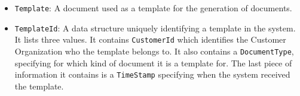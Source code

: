 \documentclass[a4paper,10pt]{article}
\begin{document}
\begin{itemize}
    \item \texttt{Template}: A document used as a template for the generation of documents.
    
    \item \texttt{TemplateId}: A data structure uniquely identifying a template in the system. It lists three values. It contains \texttt{CustomerId} which identifies the Customer Organization who the template belongs to. It also contains a \texttt{DocumentType}, specifying for which kind of document it is a template for. The last piece of information it contains is a \texttt{TimeStamp} specifying when the system received the template.
\end{itemize}
\end{document}
